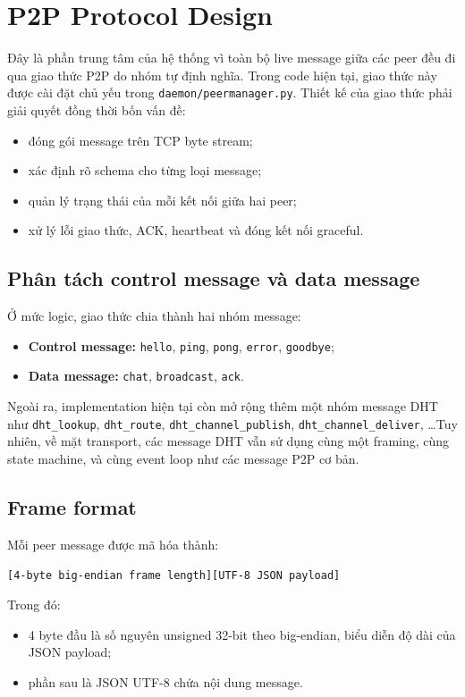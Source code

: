 \section{P2P Protocol Design}

Đây là phần trung tâm của hệ thống vì toàn bộ live message giữa các peer đều đi qua giao thức P2P do nhóm tự định nghĩa. Trong code hiện tại, giao thức này được cài đặt chủ yếu trong \texttt{daemon/peermanager.py}. Thiết kế của giao thức phải giải quyết đồng thời bốn vấn đề:
\begin{itemize}[leftmargin=2em]
    \item đóng gói message trên TCP byte stream;
    \item xác định rõ schema cho từng loại message;
    \item quản lý trạng thái của mỗi kết nối giữa hai peer;
    \item xử lý lỗi giao thức, ACK, heartbeat và đóng kết nối graceful.
\end{itemize}

\subsection{Phân tách control message và data message}
Ở mức logic, giao thức chia thành hai nhóm message:
\begin{itemize}[leftmargin=2em]
    \item \textbf{Control message:} \texttt{hello}, \texttt{ping}, \texttt{pong}, \texttt{error}, \texttt{goodbye};
    \item \textbf{Data message:} \texttt{chat}, \texttt{broadcast}, \texttt{ack}.
\end{itemize}

Ngoài ra, implementation hiện tại còn mở rộng thêm một nhóm message DHT như \texttt{dht\_lookup}, \texttt{dht\_route}, \texttt{dht\_channel\_publish}, \texttt{dht\_channel\_deliver}, \ldots Tuy nhiên, về mặt transport, các message DHT vẫn sử dụng cùng một framing, cùng state machine, và cùng event loop như các message P2P cơ bản.

\subsection{Frame format}
Mỗi peer message được mã hóa thành:
\begin{center}
\texttt{[4-byte big-endian frame length][UTF-8 JSON payload]}
\end{center}

Trong đó:
\begin{itemize}[leftmargin=2em]
    \item 4 byte đầu là số nguyên unsigned 32-bit theo big-endian, biểu diễn độ dài của JSON payload;
    \item phần sau là JSON UTF-8 chứa nội dung message.
\end{itemize}

